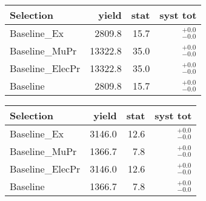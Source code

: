 
\begin{tabular}{l|rrr}
\toprule
          Selection & yield & stat & syst tot   \\ 
\midrule
       Baseline\_Ex & 2809.8 & 15.7 & ${}^{+0.0}_{-0.0}$ \\
     Baseline\_MuPr & 13322.8 & 35.0 & ${}^{+0.0}_{-0.0}$ \\
   Baseline\_ElecPr & 13322.8 & 35.0 & ${}^{+0.0}_{-0.0}$ \\
           Baseline & 2809.8 & 15.7 & ${}^{+0.0}_{-0.0}$ \\
\bottomrule
\end{tabular}



\begin{tabular}{l|rrr}
\toprule
          Selection & yield & stat & syst tot   \\ 
\midrule
       Baseline\_Ex & 3146.0 & 12.6 & ${}^{+0.0}_{-0.0}$ \\
     Baseline\_MuPr & 1366.7 & 7.8 & ${}^{+0.0}_{-0.0}$ \\
   Baseline\_ElecPr & 3146.0 & 12.6 & ${}^{+0.0}_{-0.0}$ \\
           Baseline & 1366.7 & 7.8 & ${}^{+0.0}_{-0.0}$ \\
\bottomrule
\end{tabular}
